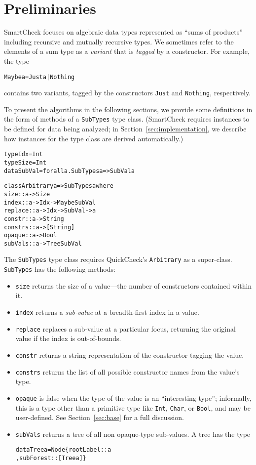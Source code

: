 \documentclass{sigplanconf}
\newenvironment{code}{\begin{alltt}\footnotesize}{\end{alltt}}
\newcommand{\ttp}[1]{\texttt{#1}}
\begin{document}
\section{Preliminaries}\label{sec:preliminaries}

SmartCheck focuses on algebraic data types represented as ``sums of products''
including recursive and mutually recursive types.  We sometimes refer to the
elements of a sum type as a \emph{variant} that is \emph{tagged} by a
constructor.  For example, the type
%
\begin{code}
Maybe a = Just a | Nothing
\end{code}
%
\noindent
contains two variants, tagged by the constructors \ttp{Just} and \ttp{Nothing},
respectively.

To present the algorithms in the following sections, we provide some definitions
in the form of methods of a \ttp{SubTypes} type class.  (SmartCheck requires
instances to be defined for data being analyzed; in
Section~\ref{sec:implementation}, we describe how instances for the type class
are derived automatically.)
%
\begin{code}
type Idx    = Int
type Size   = Int
data SubVal = forall a. SubTypes a => SubVal a

class Arbitrary a => SubTypes a where
  size    :: a -> Size
  index   :: a -> Idx -> Maybe SubVal
  replace :: a -> Idx -> SubVal -> a
  constr  :: a -> String
  constrs :: a -> [String]
  opaque  :: a -> Bool
  subVals :: a -> Tree SubVal
\end{code}
%
\noindent
The \ttp{SubTypes} type class requires QuickCheck's \ttp{Arbitrary} as a
super-class.  \ttp{SubTypes} has the following methods:
\begin{itemize}
\item \ttp{size} returns the size of a value---the number of
  constructors contained within it.
\item \ttp{index} returns a \emph{sub-value} at a breadth-first index in a
  value.
\item \ttp{replace} replaces a sub-value at a particular focus, returning the
  original value if the index is out-of-bounds.
\item \ttp{constr} returns a string representation of the constructor tagging
  the value.
\item \ttp{constrs} returns the list of all possible constructor names from the
  value's type.
\item \ttp{opaque} is false when the type of the value is an ``interesting
  type''; informally, this is a type other than a primitive type like \ttp{Int},
  \ttp{Char}, or \ttp{Bool}, and may be user-defined.  See
  Section~\ref{sec:base} for a full discussion.
\item \ttp{subVals} returns a tree of all non opaque-type sub-values.  A tree
  has the type
%
  \begin{code}
data Tree a = Node \{ rootLabel :: a
                   , subForest :: [Tree a] \}
  \end{code}
%
\end{itemize}
\end{document}
